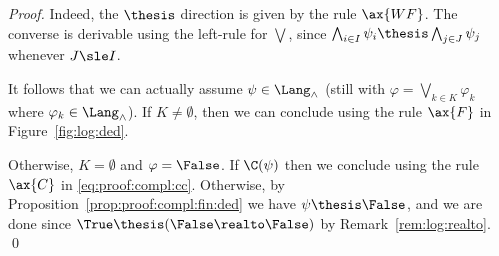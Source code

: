 \begin{proof}
\noindent
Indeed, the $\thesis$ direction is given by the rule $\ax{WF}$.
The converse is derivable using the left-rule for $\bigvee$,
since $\bigwedge_{i \in I}\psi_i \thesis \bigwedge_{j \in J}\psi_j$
whenever $J \sle I$.

It follows that we can actually assume $\psi \in \Lang_\land$
(still with $\varphi = \bigvee_{k \in K}\varphi_k$
where $\varphi_k \in \Lang_\land$).
If $K \neq \emptyset$, then we can conclude using the rule
$\ax{F}$ in Figure~\ref{fig:log:ded}.

Otherwise, $K = \emptyset$ and $\varphi = \False$.
If $\C(\psi)$ then we conclude using the rule $\ax{C}$
in \eqref{eq:proof:compl:cc}.
Otherwise, by Proposition~\ref{prop:proof:compl:fin:ded}
we have $\psi \thesis \False$,
and we are done since
$\True \thesis (\False \realto \False)$
by Remark~\ref{rem:log:realto}.
\qed
\end{proof}


